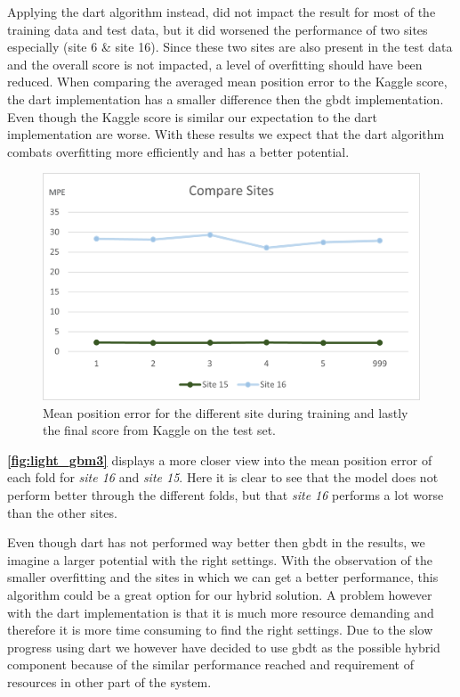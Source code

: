 Applying the \gls{dart} algorithm instead, did not impact the result for most of the training data and test data, but it did worsened the performance of two sites especially (site 6 \& site 16). Since these two sites are also present in the test data and the overall score is not impacted, a level of overfitting should have been reduced. When comparing the averaged mean position error to the Kaggle score, the \gls{dart} implementation has a smaller difference then the \gls{gbdt} implementation. Even though the Kaggle score is similar our expectation to the \gls{dart} implementation are worse. With these results we expect that the \gls{dart} algorithm combats overfitting more efficiently and has a better potential.

\begin{figure}[H]
    \centering
    \includegraphics[scale=0.6]{Images/Experiments/lightgbm/compare.png}
    \caption{Mean position error for the different site during training and lastly the final score from Kaggle on the test set.}
    \label{fig:light_gbm3}
\end{figure}

\textbf{\autoref{fig:light_gbm3}} displays a more closer view into the mean position error of each fold for \textit{site 16} and \textit{site 15}. Here it is clear to see that the model does not perform better through the different folds, but that \textit{site 16} performs a lot worse than the other sites. 

Even though \gls{dart} has not performed way better then \gls{gbdt} in the results, we imagine a larger potential with the right settings. With the observation of the smaller overfitting and the sites in which we can get a better performance, this algorithm could be a great option for our hybrid solution. A problem however with the \gls{dart} implementation is that it is much more resource demanding and therefore it is more time consuming to find the right settings. Due to the slow progress using \gls{dart} we however have decided to use \gls{gbdt} as the possible hybrid component because of the similar performance reached and requirement of resources in other part of the system.

